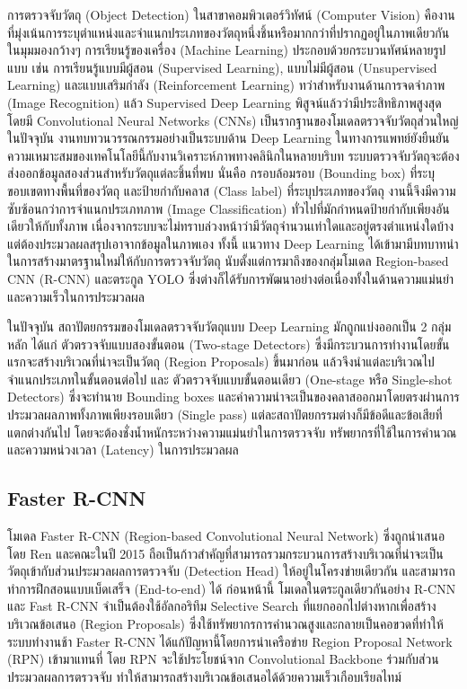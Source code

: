 การตรวจจับวัตถุ (Object Detection) ในสาขาคอมพิวเตอร์วิทัศน์ (Computer Vision) คืองานที่มุ่งเน้นการระบุตำแหน่งและจำแนกประเภทของวัตถุหนึ่งชิ้นหรือมากกว่าที่ปรากฏอยู่ในภาพเดียวกัน ในมุมมองกว้างๆ การเรียนรู้ของเครื่อง (Machine Learning) ประกอบด้วยกระบวนทัศน์หลายรูปแบบ เช่น การเรียนรู้แบบมีผู้สอน (Supervised Learning), แบบไม่มีผู้สอน (Unsupervised Learning) และแบบเสริมกำลัง (Reinforcement Learning) \cite{alam2023ml,murphy2025rl} ทว่าสำหรับงานด้านการจดจำภาพ (Image Recognition) แล้ว Supervised Deep Learning พิสูจน์แล้วว่ามีประสิทธิภาพสูงสุด โดยมี Convolutional Neural Networks (CNNs) เป็นรากฐานของโมเดลตรวจจับวัตถุส่วนใหญ่ในปัจจุบัน \cite{purwono2023cnn} งานทบทวนวรรณกรรมอย่างเป็นระบบด้าน Deep Learning ในทางการแพทย์ยังยืนยันความเหมาะสมของเทคโนโลยีนี้กับงานวิเคราะห์ภาพทางคลินิกในหลายบริบท \cite{egger2022} ระบบตรวจจับวัตถุจะต้องส่งออกข้อมูลสองส่วนสำหรับวัตถุแต่ละชิ้นที่พบ นั่นคือ กรอบล้อมรอบ (Bounding box) ที่ระบุขอบเขตทางพื้นที่ของวัตถุ และป้ายกำกับคลาส (Class label) ที่ระบุประเภทของวัตถุ งานนี้จึงมีความซับซ้อนกว่าการจำแนกประเภทภาพ (Image Classification) ทั่วไปที่มักกำหนดป้ายกำกับเพียงอันเดียวให้กับทั้งภาพ เนื่องจากระบบจะไม่ทราบล่วงหน้าว่ามีวัตถุจำนวนเท่าใดและอยู่ตรงตำแหน่งใดบ้าง แต่ต้องประมวลผลสรุปเอาจากข้อมูลในภาพเอง ทั้งนี้ แนวทาง Deep Learning ได้เข้ามามีบทบาทนำในการสร้างมาตรฐานใหม่ให้กับการตรวจจับวัตถุ นับตั้งแต่การมาถึงของกลุ่มโมเดล Region-based CNN (R-CNN) และตระกูล YOLO ซึ่งต่างก็ได้รับการพัฒนาอย่างต่อเนื่องทั้งในด้านความแม่นยำและความเร็วในการประมวลผล

ในปัจจุบัน สถาปัตยกรรมของโมเดลตรวจจับวัตถุแบบ Deep Learning มักถูกแบ่งออกเป็น 2 กลุ่มหลัก ได้แก่ ตัวตรวจจับแบบสองขั้นตอน (Two-stage Detectors) ซึ่งมีกระบวนการทำงานโดยขั้นแรกจะสร้างบริเวณที่น่าจะเป็นวัตถุ (Region Proposals) ขึ้นมาก่อน แล้วจึงนำแต่ละบริเวณไปจำแนกประเภทในขั้นตอนต่อไป และ ตัวตรวจจับแบบขั้นตอนเดียว (One-stage หรือ Single-shot Detectors) ซึ่งจะทำนาย Bounding boxes และค่าความน่าจะเป็นของคลาสออกมาโดยตรงผ่านการประมวลผลภาพทั้งภาพเพียงรอบเดียว (Single pass) แต่ละสถาปัตยกรรมต่างก็มีข้อดีและข้อเสียที่แตกต่างกันไป โดยจะต้องชั่งน้ำหนักระหว่างความแม่นยำในการตรวจจับ ทรัพยากรที่ใช้ในการคำนวณ และความหน่วงเวลา (Latency) ในการประมวลผล

\subsection{Faster R-CNN}

โมเดล Faster R-CNN (Region-based Convolutional Neural Network) ซึ่งถูกนำเสนอโดย Ren และคณะในปี 2015 ถือเป็นก้าวสำคัญที่สามารถรวมกระบวนการสร้างบริเวณที่น่าจะเป็นวัตถุเข้ากับส่วนประมวลผลการตรวจจับ (Detection Head) ให้อยู่ในโครงข่ายเดียวกัน และสามารถทำการฝึกสอนแบบเบ็ดเสร็จ (End-to-end) ได้ \cite{ren2015faster} ก่อนหน้านี้ โมเดลในตระกูลเดียวกันอย่าง R-CNN และ Fast R-CNN จำเป็นต้องใช้อัลกอริทึม Selective Search ที่แยกออกไปต่างหากเพื่อสร้างบริเวณข้อเสนอ (Region Proposals) ซึ่งใช้ทรัพยากรการคำนวณสูงและกลายเป็นคอขวดที่ทำให้ระบบทำงานช้า Faster R-CNN ได้แก้ปัญหานี้โดยการนำเครือข่าย Region Proposal Network (RPN) เข้ามาแทนที่ โดย RPN จะใช้ประโยชน์จาก Convolutional Backbone ร่วมกับส่วนประมวลผลการตรวจจับ ทำให้สามารถสร้างบริเวณข้อเสนอได้ด้วยความเร็วเกือบเรียลไทม์



